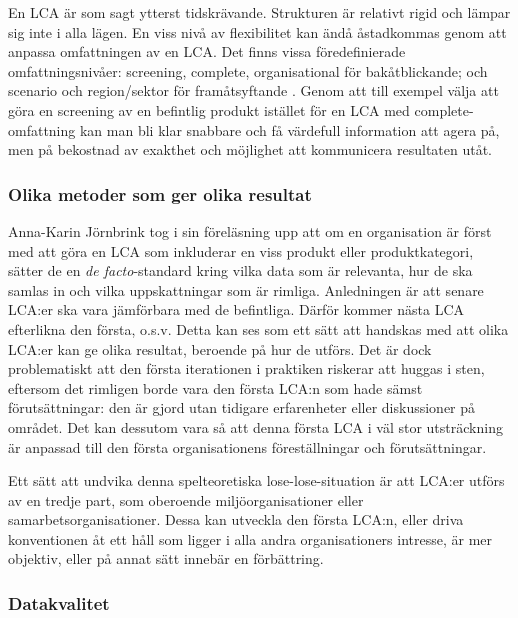 \documentclass{article}
\begin{document}
En LCA är som sagt ytterst tidskrävande. Strukturen är relativt rigid och lämpar sig inte i alla lägen. En viss nivå av flexibilitet kan ändå åstadkommas genom att anpassa omfattningen av en LCA. Det finns vissa föredefinierade omfattningsnivåer:  screening, complete, organisational för bakåtblickande; och scenario och region/sektor för framåtsyftande . Genom att till exempel välja att göra en screening av en befintlig produkt istället för en LCA med complete-omfattning kan man bli klar snabbare och få värdefull information att agera på, men på bekostnad av exakthet och möjlighet att kommunicera resultaten utåt.

\subsubsection{Olika metoder som ger olika resultat}

Anna-Karin Jörnbrink tog i sin föreläsning upp att om en organisation är först med att göra en LCA som inkluderar en viss produkt eller produktkategori, sätter de en \emph{de facto}-standard kring vilka data som är relevanta, hur de ska samlas in och vilka uppskattningar som är rimliga. Anledningen är att senare LCA:er ska vara jämförbara med de befintliga. Därför kommer nästa LCA efterlikna den första, o.s.v. Detta kan ses som ett sätt att handskas med att olika LCA:er kan ge olika resultat, beroende på hur de utförs. Det är dock problematiskt att den första iterationen i praktiken riskerar att huggas i sten, eftersom det rimligen borde vara den första LCA:n som hade sämst förutsättningar: den är gjord utan tidigare erfarenheter eller diskussioner på området. Det kan dessutom vara så att denna första LCA i väl stor utsträckning är anpassad till den första organisationens föreställningar och förutsättningar. 

Ett sätt att undvika denna spelteoretiska lose-lose-situation är att LCA:er utförs av en tredje part, som oberoende miljöorganisationer eller samarbetsorganisationer. Dessa kan utveckla den första LCA:n, eller driva konventionen åt ett håll som ligger i alla andra organisationers intresse, är mer objektiv, eller på annat sätt innebär en förbättring.

\subsubsection{Datakvalitet}
\end{document}
